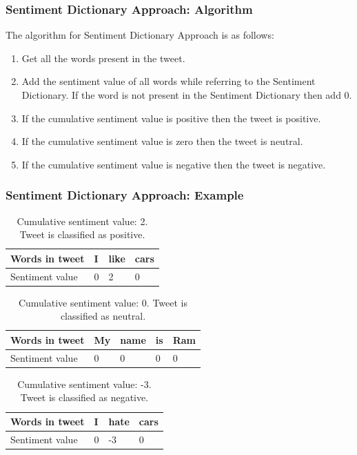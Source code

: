 \documentclass[12pt,xcolor=dvipsnames,table,titlepage]{beamer}
\begin{document}
\begin{frame}[t]
\frametitle{Sentiment Dictionary Approach: Algorithm}
The algorithm for Sentiment Dictionary Approach is as follows:
\begin{enumerate}
 \item Get all the words present in the tweet.
 \item Add the sentiment value of all words while referring to the Sentiment Dictionary. 
 If the word is not present in the Sentiment Dictionary then add 0.
 \item If the cumulative sentiment value is positive then the tweet is positive.
 \item If the cumulative sentiment value is zero then the tweet is neutral.
 \item If the cumulative sentiment value is negative then the tweet is negative.
\end{enumerate}
\end{frame}

\begin{frame}[t]
\frametitle{Sentiment Dictionary Approach: Example}
\begin{table}[h]
\begin{tabular}{|l|l|l|l|}
\hline
Words in tweet  & I & like & cars \\ \hline
Sentiment value & 0 & 2    & 0    \\ \hline
\end{tabular}
\caption{Cumulative sentiment value: 2. Tweet is classified as positive.}
\end{table}

\begin{table}[h]
\begin{tabular}{|l|l|l|l|l|}
\hline
Words in tweet  & My & name & is & Ram \\ \hline
Sentiment value & 0  & 0    & 0  & 0   \\ \hline
\end{tabular}
\caption{Cumulative sentiment value: 0. Tweet is classified as neutral.}
\end{table}

\begin{table}[h]
\begin{tabular}{|l|l|l|l|}
\hline
Words in tweet  & I & hate & cars \\ \hline
Sentiment value & 0 & -3    & 0    \\ \hline
\end{tabular}
\caption{Cumulative sentiment value: -3. Tweet is classified as negative.}
\end{table}
\end{frame}
\end{document}
